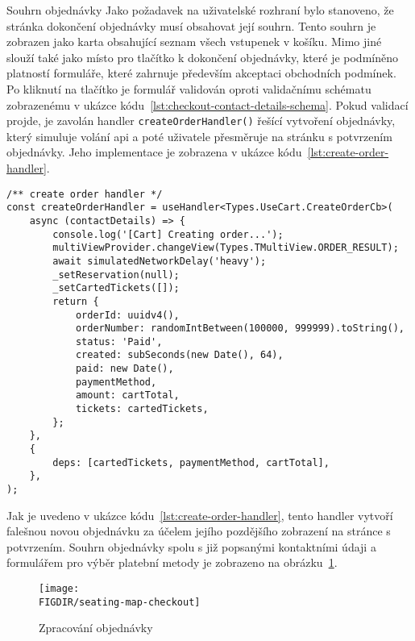 \begin{subsection}{Souhrn objednávky}
    \label{subsec:implementace-checkout-souhrn}
    Jako požadavek na uživatelské rozhraní bylo stanoveno, že stránka dokončení objednávky musí obsahovat její souhrn.
    Tento souhrn je zobrazen jako karta obsahující seznam všech vstupenek v košíku.
    Mimo jiné slouží také jako místo pro tlačítko k dokončení objednávky, které je podmíněno platností formuláře, které zahrnuje především akceptaci obchodních podmínek.
    Po kliknutí na tlačítko je formulář validován oproti validačnímu schématu zobrazenému v ukázce kódu~\ref{lst:checkout-contact-details-schema}.
    Pokud validací projde, je zavolán handler \texttt{createOrderHandler()} řešící vytvoření objednávky, který simuluje volání \ac{api} a poté uživatele přesměruje na stránku s potvrzením objednávky.
    Jeho implementace je zobrazena v ukázce kódu~\ref{lst:create-order-handler}.

    \begin{listing}[H]
        \begin{verbatim}
/** create order handler */
const createOrderHandler = useHandler<Types.UseCart.CreateOrderCb>(
	async (contactDetails) => {
		console.log('[Cart] Creating order...');
		multiViewProvider.changeView(Types.TMultiView.ORDER_RESULT);
		await simulatedNetworkDelay('heavy');
		_setReservation(null);
		_setCartedTickets([]);
		return {
			orderId: uuidv4(),
			orderNumber: randomIntBetween(100000, 999999).toString(),
			status: 'Paid',
			created: subSeconds(new Date(), 64),
			paid: new Date(),
			paymentMethod,
			amount: cartTotal,
			tickets: cartedTickets,
		};
	},
	{
		deps: [cartedTickets, paymentMethod, cartTotal],
	},
);
        \end{verbatim}
        \caption{Implementace handleru pro vytvoření objednávky}
        \label{lst:create-order-handler}
    \end{listing}

    Jak je uvedeno v ukázce kódu~\ref{lst:create-order-handler}, tento handler vytvoří falešnou novou objednávku za účelem jejího pozdějšího zobrazení na stránce s potvrzením.
    Souhrn objednávky spolu s již popsanými kontaktními údaji a formulářem pro výběr platební metody je zobrazeno na obrázku~\ref{fig:seating-map-checkout}.

    \begin{figure}[H]
        \centering
        \caption{Zpracování objednávky}
        \texttt{[image: \\FIGDIR/seating-map-checkout]}
        \source{}
        \label{fig:seating-map-checkout}
    \end{figure}
\end{subsection}
\pagebreak

